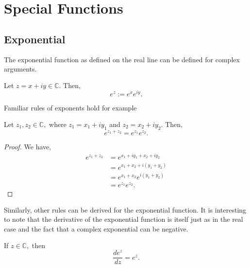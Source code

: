 \documentclass[12pt]{book}
\begin{document}
\section{Special Functions}
\subsection{Exponential}
The exponential function as defined on the real line can be defined for complex arguments. 
\begin{defn}
    Let $z = x + iy \in \mathbb{C}.$ Then,
    \[
        e^{z} := e^{x}e^{iy}.
    \]
\end{defn}
Familiar rules of exponents hold for example 
\begin{thm}
    Let $z_1, z_2 \in \mathbb{C},$ where $z_1 = x_1 + iy_1$ and $z_2 = x_2 + iy_2$. Then,
    \[
        e^{z_1 + z_2} = e^{z_1}e^{z_2}.
    \]
\end{thm}
\begin{proof}
    We have,
    \begin{align*}
        e^{z_1 + z_2}
            &=
                e^{x_1 + iy_1 + x_2 + iy_2}\\
            &=
                e^{x_1 + x_2 + i(y_1 + y_2)}\\
            &=
                e^{x_1 + x_2}e^{i(y_1 + y_2)}\\
            &=
                e^{z_1}e^{z_2}.
    \end{align*}
\end{proof}
Similarly, other rules can be derived for the exponential function. It is interesting to note that the derivative of the exponential function is itself just as in the real case and the fact that a complex exponential can be negative. 
\begin{thm}
    If $z \in \mathbb{C},$ then
    \[
        \frac{d e^{z}}{d z} = e^{z}.
    \]
\end{thm}
\end{document}
